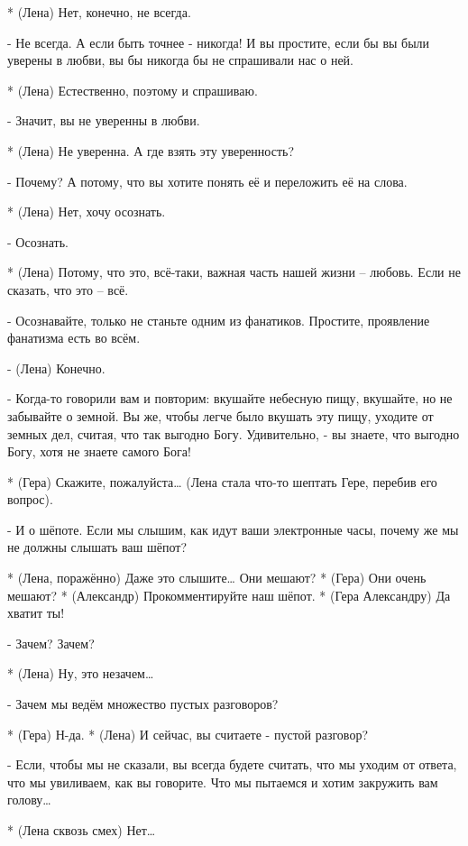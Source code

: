 * (Лена) Нет, конечно, не всегда.

- Не всегда. А если быть точнее - никогда! И вы простите, если бы вы были уверены в любви, вы бы никогда бы не спрашивали нас о ней.

* (Лена) Естественно, поэтому и спрашиваю.

- Значит, вы не уверенны в любви.

* (Лена) Не уверенна. А где взять эту уверенность?

- Почему? А потому, что вы хотите понять её и переложить её на слова.

* (Лена) Нет, хочу осознать.

- Осознать.

* (Лена) Потому, что это, всё-таки, важная часть нашей жизни – любовь. Если не сказать, что это – всё.

-  Осознавайте, только не станьте одним из фанатиков. Простите, проявление фанатизма есть во всём.

- (Лена) Конечно.

- Когда-то говорили вам и повторим: вкушайте небесную пищу, вкушайте, но не забывайте о земной. Вы же, чтобы легче было вкушать эту пищу, уходите от земных дел, считая, что так выгодно Богу. Удивительно, - вы знаете, что выгодно Богу, хотя не знаете самого Бога!

* (Гера) Скажите, пожалуйста… (Лена стала что-то шептать Гере, перебив его вопрос).

- И о шёпоте. Если мы слышим, как идут ваши электронные часы, почему же мы не должны слышать ваш шёпот?

* (Лена, поражённо) Даже это слышите… Они мешают?
* (Гера) Они очень мешают?
* (Александр) Прокомментируйте наш шёпот.
* (Гера Александру) Да хватит ты!

- Зачем? Зачем?

* (Лена) Ну, это незачем…

- Зачем мы ведём множество пустых разговоров?

* (Гера) Н-да.
* (Лена) И сейчас, вы считаете - пустой разговор?

- Если, чтобы мы не сказали, вы всегда будете считать, что мы уходим от ответа, что мы увиливаем, как вы говорите. Что мы пытаемся и хотим закружить вам голову…

* (Лена сквозь смех) Нет…

